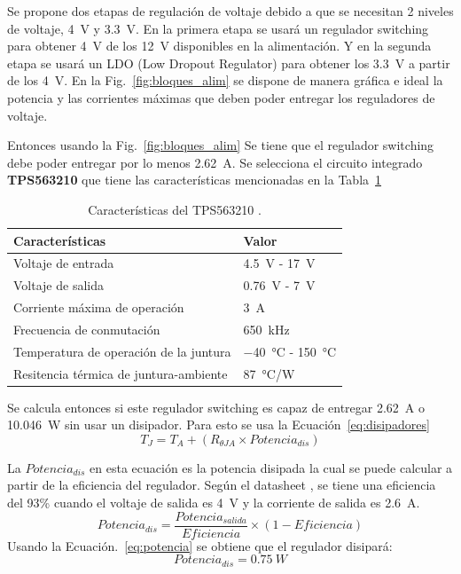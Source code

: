 Se propone dos etapas de regulación de voltaje debido a que se necesitan 2 niveles de voltaje, \SI{4}{V} y \SI{3.3}{V}. En la primera etapa se usará un regulador switching para obtener \SI{4}{V} de los \SI{12}{V} disponibles en la alimentación. Y en la segunda etapa se usará un LDO (Low Dropout Regulator) para obtener los \SI{3.3}{V} a partir de los \SI{4}{V}. En la Fig.~\ref{fig:bloques_alim} se dispone de manera gráfica e ideal la potencia y las corrientes máximas que deben poder entregar los reguladores de voltaje.



Entonces usando  la Fig.~\ref{fig:bloques_alim} Se tiene que el regulador switching debe poder entregar por lo menos \SI{2.62}{A}. Se selecciona el circuito integrado \textbf{TPS563210} que tiene las características mencionadas en la Tabla~\ref{diag:Switching}

\bgroup
\def\arraystretch{1.5}%
\begin{table}[htbp!]
\centering
\caption[Características del TPS563210]{Características del TPS563210 \cite{TPS563210}.}
\begin{tabular}{@{}ll@{}}
\toprule
Características & Valor \\ \midrule
Voltaje de entrada & \SI{4.5}{V} - \SI{17}{V} \\
Voltaje de salida & \SI{0.76}{V} - \SI{7}{V} \\
Corriente máxima de operación & \SI{3}{A} \\
Frecuencia de conmutación & \SI{650}{kHz} \\
Temperatura de operación de la juntura & \SI{-40}{\celsius} - \SI{150}{\celsius}\\
Resitencia térmica de juntura-ambiente & \SI{87}{\celsius/W}\\\bottomrule
\end{tabular}
\label{diag:Switching}
\end{table}
\egroup


Se calcula entonces si este regulador switching es capaz de entregar \SI{2.62}{A} o \SI{10.046}{W} sin usar un disipador. Para esto se usa la Ecuación~\ref{eq:disipadores}
\begin{equation}
   T_J=T_A+(R_{\theta JA} \times Potencia_{dis})
   \label{eq:disipadores}
\end{equation}

La $Potencia_{dis}$ en esta ecuación es la potencia disipada la cual se puede calcular a partir de la eficiencia del regulador. Según el datasheet \cite{TPS563210}, se tiene una eficiencia del 93\% cuando el voltaje de salida es \SI{4}{V} y la corriente de salida es \SI{2.6}{A}.
\begin{equation}
    Potencia_{dis}=\frac{Potencia_{salida}}{Eficiencia}\times(1-Eficiencia)
     \label{eq:potencia}
\end{equation}
Usando la Ecuación.~\ref{eq:potencia} se obtiene que el regulador disipará:
 $$Potencia_{dis}=\SI{0.75}{W}$$

